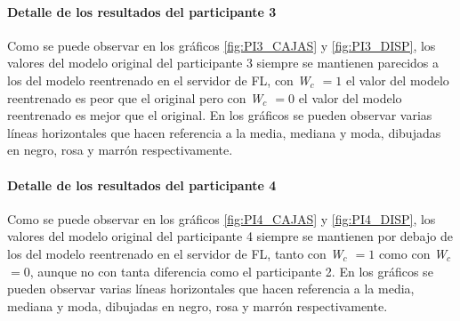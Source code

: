 \paragraph{Detalle de los resultados del participante 3}
Como se puede observar en los gráficos \ref{fig:PI3_CAJAS} y \ref{fig:PI3_DISP}, los valores del modelo original del participante 3 siempre se mantienen parecidos a los del modelo reentrenado en el servidor de FL, con \textit{W$_c$ $=1$} el valor del modelo reentrenado es peor que el original pero con \textit{W$_c$ $=0$} el valor del modelo reentrenado es mejor que el original. En los gráficos se pueden observar varias líneas horizontales que hacen referencia a la media, mediana y moda, dibujadas en negro, rosa y marrón respectivamente.

\paragraph{Detalle de los resultados del participante 4}
Como se puede observar en los gráficos \ref{fig:PI4_CAJAS} y \ref{fig:PI4_DISP}, los valores del modelo original del participante 4 siempre se mantienen por debajo de los del modelo reentrenado en el servidor de FL, tanto con \textit{W$_c$ $=1$} como con \textit{W$_c$ $=0$}, aunque no con tanta diferencia como el participante 2. En los gráficos se pueden observar varias líneas horizontales que hacen referencia a la media, mediana y moda, dibujadas en negro, rosa y marrón respectivamente.

